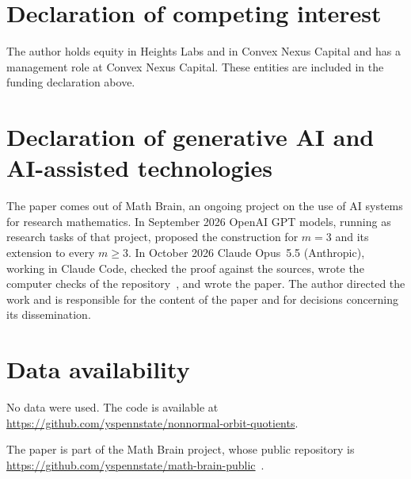 \documentclass[11pt]{amsart}
\theoremstyle{definition}
\theoremstyle{remark}
\begin{document}
\section*{Declaration of competing interest}
The author holds equity in Heights Labs and in Convex Nexus Capital and
has a management role at Convex Nexus Capital. These entities are included
in the funding declaration above.

\section*{Declaration of generative AI and AI-assisted technologies}
The paper comes out of Math Brain, an ongoing project on the use of AI systems for research mathematics. In September 2026 OpenAI GPT models, running as research tasks of that project, proposed the construction for $m=3$ and its extension to every $m\ge3$. In October 2026 Claude Opus~5.5 (Anthropic), working in Claude Code, checked the proof against the sources, wrote the computer checks of the repository~\cite{code}, and wrote the paper. The author directed the work and is responsible for the content of the paper and for decisions concerning its dissemination.

\section*{Data availability}
No data were used. The code is available at\\ \url{https://github.com/yspennstate/nonnormal-orbit-quotients}.

The paper is part of the Math Brain project, whose public repository is \url{https://github.com/yspennstate/math-brain-public}~\cite{MathBrainRepo}.
\end{document}
